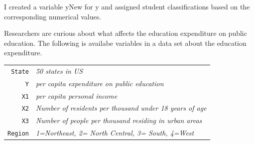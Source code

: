 \documentclass[12pt,letterpaper]{article}
\begin{document}
\noindent I created a variable yNew for y and assigned student classifications based on the corresponding numerical values.



\vspace{.5cm}

\noindent Researchers are curious about what affects the education expenditure on public education. The following is availabe variables in a data set about the education expenditure. \\
\vspace{.5cm}


\begin{tabular}{r|l}
	\texttt{State} &\emph{50 states in US} \\
	\texttt{Y} & \emph{per capita expenditure on public education}\\
	\texttt{X1} &\emph{per capita personal income} \\
	\texttt{X2} &  \emph{Number of residents per thousand under 18 years of age}\\
	\texttt{X3} &  \emph{Number of people per thousand residing in urban areas} \\
	\texttt{Region} &  \emph{1=Northeast, 2= North Central, 3= South, 4=West} \\
\end{tabular}
\end{document}
